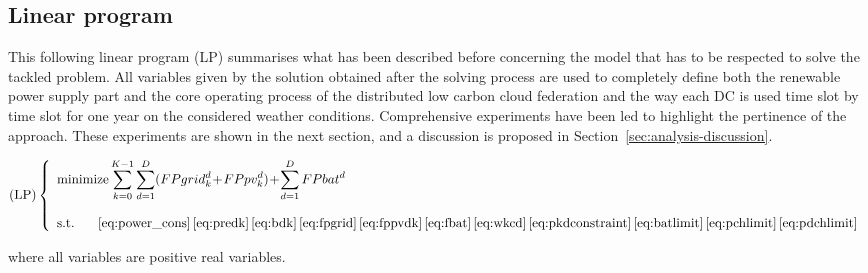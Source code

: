 
\subsection{Linear program}

This following linear program (LP) summarises what has been described before concerning the model that has to be respected to solve the tackled problem. All variables given by the solution obtained after the solving process are used to completely define both the renewable power supply part and the core operating process of the distributed low carbon cloud federation and the way each DC is used time slot by time slot for one year on the considered weather conditions. Comprehensive experiments have been led to highlight the pertinence of the approach. These experiments are shown in the next section, and a discussion is proposed in Section~\ref{sec:analysis-discussion}.


\begin{equation}\nonumber
    \text{(LP)}\left\{
    \begin{array}{ll}
        \text{minimize}\displaystyle\sum_{k=0}^{K-1}\sum_{d=1}^D (FPgrid^d_k\!+\!FPpv^d_k)\!+\!\sum_{d=1}^D FPbat^d \label{eq:lp}\\ \\
        \text{s.t. } \ \ \ \ 
\eqref{eq:power_cons}\,\eqref{eq:predk}\,\eqref{eq:bdk}\,\eqref{eq:fpgrid}\,\eqref{eq:fppvdk}\,\eqref{eq:fbat}\,\eqref{eq:wkcd}\,\eqref{eq:pkdconstraint}\,\eqref{eq:batlimit}\,\eqref{eq:pchlimit}\,\eqref{eq:pdchlimit} %
    \end{array}
    \right.
\end{equation}

where all variables are positive real variables. 




